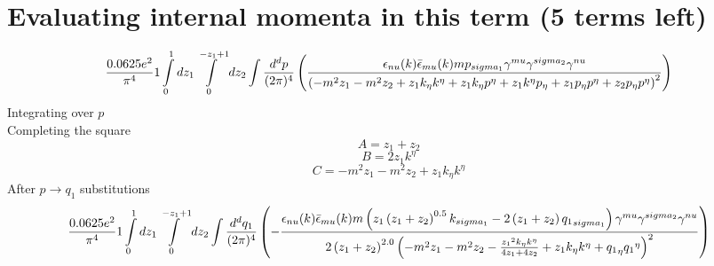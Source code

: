 \section*{Evaluating internal momenta in this term (5 terms left)}
\begin{dmath}\frac{0.0625 e^{2}}{\pi^{4}}1\int\limits_{ 0 }^{ 1 } d{ z_{ 1 } }\int\limits_{ 0 }^{ - { z_{ 1 } } + 1 } d{ z_{ 2 } }\int\frac{d^d p }{ (2\pi)^4 }\left(\frac{\epsilon_{ \\nu }({ k }) \bar{\epsilon}_{ \\mu }({ k }) m { { p }_{ \\sigma_1 } } { \gamma^{ \\mu } } { \gamma^{ \\sigma_2 } } { \gamma^{ \\nu } }}{\left(- m^{2} { z_{ 1 } } - m^{2} { z_{ 2 } } + { z_{ 1 } } { { k }_{ \eta } } { { k }^{ \eta } } + { z_{ 1 } } { { k }_{ \eta } } { { p }^{ \eta } } + { z_{ 1 } } { { k }^{ \eta } } { { p }_{ \eta } } + { z_{ 1 } } { { p }_{ \eta } } { { p }^{ \eta } } + { z_{ 2 } } { { p }_{ \eta } } { { p }^{ \eta } }\right)^{2}}\right)\end{dmath}
Integrating over $p$\\
Completing the square\
\begin{dmath}A = { z_{ 1 } } + { z_{ 2 } }\end{dmath}
\begin{dmath}B = 2 { z_{ 1 } } { { k }^{ \eta } }\end{dmath}
\begin{dmath}C = - m^{2} { z_{ 1 } } - m^{2} { z_{ 2 } } + { z_{ 1 } } { { k }_{ \eta } } { { k }^{ \eta } }\end{dmath}
After $p \to q_1$ substitutions
\begin{dmath}\frac{0.0625 e^{2}}{\pi^{4}}1\int\limits_{ 0 }^{ 1 } d{ z_{ 1 } }\int\limits_{ 0 }^{ - { z_{ 1 } } + 1 } d{ z_{ 2 } }\int\frac{d^d q_1 }{ (2\pi)^4 }\left(- \frac{\epsilon_{ \\nu }({ k }) \bar{\epsilon}_{ \\mu }({ k }) m \left({ z_{ 1 } } \left({ z_{ 1 } } + { z_{ 2 } }\right)^{0.5} { { k }_{ \\sigma_1 } } - 2 \left({ z_{ 1 } } + { z_{ 2 } }\right) { { q_1 }_{ \\sigma_1 } }\right) { \gamma^{ \\mu } } { \gamma^{ \\sigma_2 } } { \gamma^{ \\nu } }}{2 \left({ z_{ 1 } } + { z_{ 2 } }\right)^{2.0} \left(- m^{2} { z_{ 1 } } - m^{2} { z_{ 2 } } - \frac{{ z_{ 1 } }^{2} { { k }_{ \eta } } { { k }^{ \eta } }}{4 { z_{ 1 } } + 4 { z_{ 2 } }} + { z_{ 1 } } { { k }_{ \eta } } { { k }^{ \eta } } + { { q_1 }_{ \eta } } { { q_1 }^{ \eta } }\right)^{2}}\right)\end{dmath}
